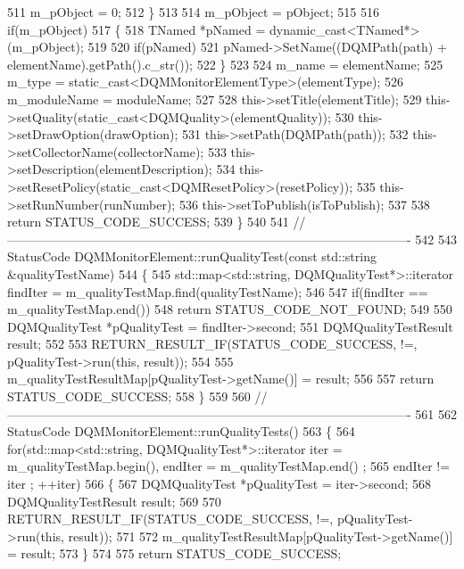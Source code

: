 \begin{DoxyCode}
511     m\_pObject = 0;
512   \}
513 
514   m\_pObject = pObject;
515 
516   \textcolor{keywordflow}{if}(m\_pObject)
517   \{
518     TNamed *pNamed = \textcolor{keyword}{dynamic\_cast<}TNamed*\textcolor{keyword}{>}(m\_pObject);
519 
520     \textcolor{keywordflow}{if}(pNamed)
521       pNamed->SetName((DQMPath(path) + elementName).getPath().c\_str());
522   \}
523 
524   m\_name = elementName;
525   m\_type = \textcolor{keyword}{static\_cast<}DQMMonitorElementType\textcolor{keyword}{>}(elementType);
526   m\_moduleName = moduleName;
527 
528   this->setTitle(elementTitle);
529   this->setQuality(static\_cast<DQMQuality>(elementQuality));
530   this->setDrawOption(drawOption);
531   this->setPath(DQMPath(path));
532   this->setCollectorName(collectorName);
533   this->setDescription(elementDescription);
534   this->setResetPolicy(static\_cast<DQMResetPolicy>(resetPolicy));
535   this->setRunNumber(runNumber);
536   this->setToPublish(isToPublish);
537 
538   \textcolor{keywordflow}{return} STATUS\_CODE\_SUCCESS;
539 \}
540 
541 \textcolor{comment}{//-------------------------------------------------------------------------------------------------}
542 
543 StatusCode DQMMonitorElement::runQualityTest(\textcolor{keyword}{const} std::string &qualityTestName)
544 \{
545   std::map<std::string, DQMQualityTest*>::iterator findIter = m\_qualityTestMap.find(qualityTestName);
546 
547   \textcolor{keywordflow}{if}(findIter == m\_qualityTestMap.end())
548     \textcolor{keywordflow}{return} STATUS\_CODE\_NOT\_FOUND;
549 
550   DQMQualityTest *pQualityTest = findIter->second;
551   DQMQualityTestResult result;
552 
553   RETURN_RESULT_IF(STATUS\_CODE\_SUCCESS, !=, pQualityTest->run(\textcolor{keyword}{this}, result));
554 
555   m\_qualityTestResultMap[pQualityTest->getName()] = result;
556 
557   \textcolor{keywordflow}{return} STATUS\_CODE\_SUCCESS;
558 \}
559 
560 \textcolor{comment}{//-------------------------------------------------------------------------------------------------}
561 
562 StatusCode DQMMonitorElement::runQualityTests()
563 \{
564   \textcolor{keywordflow}{for}(std::map<std::string, DQMQualityTest*>::iterator iter = m\_qualityTestMap.begin(), endIter = 
      m\_qualityTestMap.end() ;
565       endIter != iter ; ++iter)
566   \{
567     DQMQualityTest *pQualityTest = iter->second;
568     DQMQualityTestResult result;
569 
570     RETURN_RESULT_IF(STATUS\_CODE\_SUCCESS, !=, pQualityTest->run(\textcolor{keyword}{this}, result));
571 
572     m\_qualityTestResultMap[pQualityTest->getName()] = result;
573   \}
574 
575   \textcolor{keywordflow}{return} STATUS\_CODE\_SUCCESS;

\end{DoxyCode}
